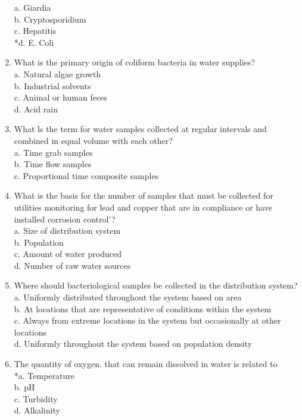 \begin{enumerate}[1.]
a. Giardia\\
b. Cryptosporidium\\
c. Hepatitis\\
*d. E. Coli\\
\item What is the primary origin of coliform bacteria in water supplies?\\
a. Natural algae growth\\
b. Industrial solvents\\
c. Animal or human feces\\
d. Acid rain\\
\item What ls the term for water samples collected at regular intervals and combined in equal volume with each other?\\
a. Time grab samples\\
b. Time flow samples\\
c. Proportional time composite samples\\
\item What is the basis for the number of samples that must be collected for utilities monitoring for lead and copper that are in compliance or have installed corrosion control'?\\
a. Size of distribution system\\
b. Population\\
c. Amount of water produced\\
d. Number of raw water sources\\
\item Where should bacteriological samples be collected in the distribution system?\\
a. Uniformly distributed throughout the system based on area\\
b. At locations that are representative of conditions within the system\\
c. Always from extreme locations in the system but occasionally at other locations\\
d. Uniformly throughout the system based on population density\\
\item The quantity of oxygen. that can remain dissolved in water is related to\\
*a. Temperature\\
b. $\mathrm{pH}$\\
c. Turbidity\\
d. Alkalinity\\


\end{enumerate}
